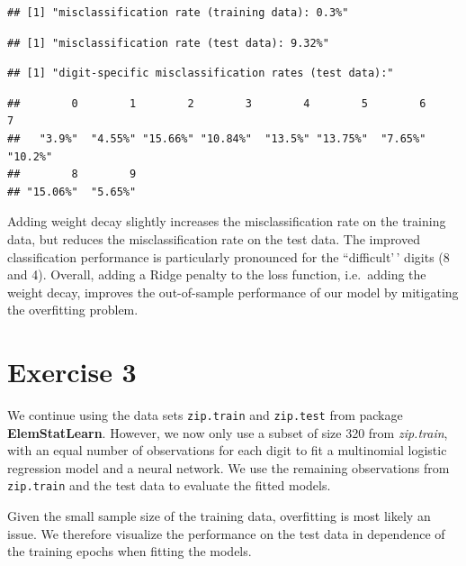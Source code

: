 \documentclass[
]{article}
\begin{document}
\begin{verbatim}
## [1] "misclassification rate (training data): 0.3%"
\end{verbatim}

\begin{verbatim}
## [1] "misclassification rate (test data): 9.32%"
\end{verbatim}

\begin{verbatim}
## [1] "digit-specific misclassification rates (test data):"
\end{verbatim}

\begin{verbatim}
##        0        1        2        3        4        5        6        7 
##   "3.9%"  "4.55%" "15.66%" "10.84%"  "13.5%" "13.75%"  "7.65%"  "10.2%" 
##        8        9 
## "15.06%"  "5.65%"
\end{verbatim}

Adding weight decay slightly increases the misclassification rate on the
training data, but reduces the misclassification rate on the test data.
The improved classification performance is particularly pronounced for
the ``difficult'\,' digits (8 and 4). Overall, adding a Ridge penalty to
the loss function, i.e.~adding the weight decay, improves the
out-of-sample performance of our model by mitigating the overfitting
problem.

\newpage

\section{Exercise 3}\label{exercise-3}

We continue using the data sets \texttt{zip.train} and \texttt{zip.test}
from package \textbf{ElemStatLearn}. However, we now only use a subset
of size 320 from \textit{zip.train}, with an equal number of
observations for each digit to fit a multinomial logistic regression
model and a neural network. We use the remaining observations from
\texttt{zip.train} and the test data to evaluate the fitted models.

Given the small sample size of the training data, overfitting is most
likely an issue. We therefore visualize the performance on the test data
in dependence of the training epochs when fitting the models.
\end{document}
